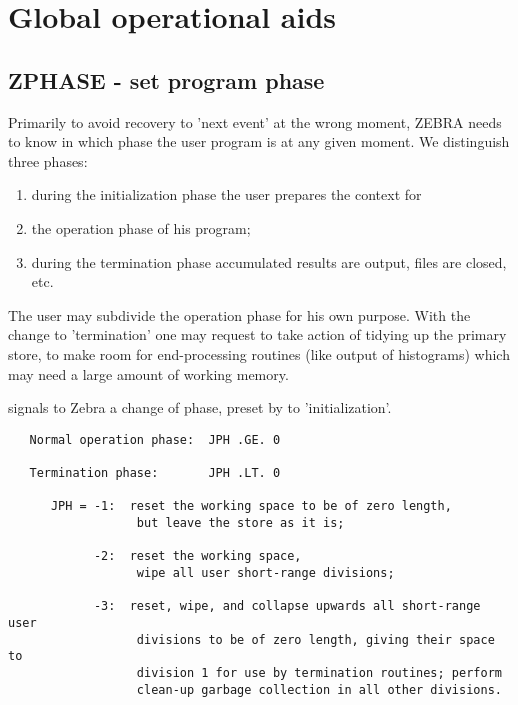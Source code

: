 \chapter{Global operational aids}
\label{sec:H1-MZ-Global-operational-aids}

\section{ZPHASE - set program phase}

Primarily to avoid recovery to 'next event' at the wrong moment,
ZEBRA needs to know in which phase the user program is at any
given moment.
We distinguish three phases:

\begin{enumerate}
\item during the initialization phase the user prepares the context for
\item the operation phase of his program;
\item during the termination phase accumulated results are output,
      files are closed, etc.
\end{enumerate}
 
The user may subdivide the operation phase for his own purpose.
With the change to 'termination' one may request  to take
action of tidying up the primary store,
to make room for end-processing routines (like output of histograms)
which may need a large amount of working memory.


signals to Zebra a change of phase, preset by  to 'initialization'.

\begin{verbatim}
   Normal operation phase:  JPH .GE. 0

   Termination phase:       JPH .LT. 0

      JPH = -1:  reset the working space to be of zero length,
                  but leave the store as it is;

            -2:  reset the working space,
                  wipe all user short-range divisions;

            -3:  reset, wipe, and collapse upwards all short-range user
                  divisions to be of zero length, giving their space to
                  division 1 for use by termination routines; perform
                  clean-up garbage collection in all other divisions.
\end{verbatim} 

